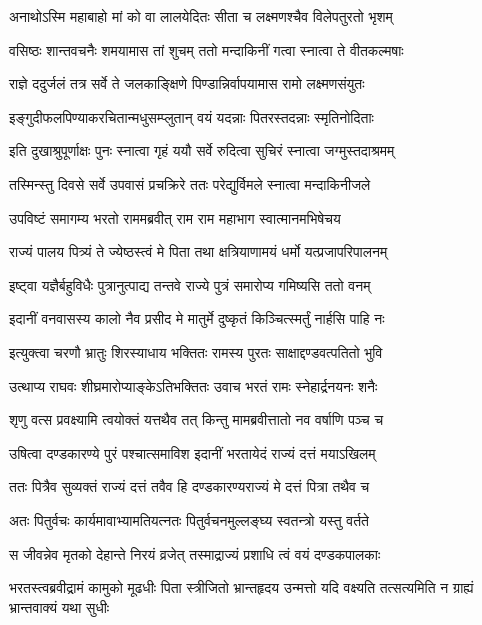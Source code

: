 \twolineshloka
{अनाथोऽस्मि महाबाहो मां को वा लालयेदितः}
{सीता च लक्ष्मणश्चैव विलेपतुरतो भृशम्} %

\twolineshloka
{वसिष्ठः शान्तवचनैः शमयामास तां शुचम्}
{ततो मन्दाकिनीं गत्वा स्नात्वा ते वीतकल्मषाः} %

\twolineshloka
{राज्ञे ददुर्जलं तत्र सर्वे ते जलकाङ्क्षिणे}
{पिण्डान्निर्वापयामास रामो लक्ष्मणसंयुतः} %

\twolineshloka
{इङ्गुदीफलपिण्याकरचितान्मधुसम्प्लुतान्}
{वयं यदन्नाः पितरस्तदन्नाः स्मृतिनोदिताः} %

\twolineshloka
{इति दुखाश्रुपूर्णाक्षः पुनः स्नात्वा गृहं ययौ}
{सर्वे रुदित्वा सुचिरं स्नात्वा जग्मुस्तदाश्रमम्} %

\twolineshloka
{तस्मिन्स्तु दिवसे सर्वे उपवासं प्रचक्रिरे}
{ततः परेद्युर्विमले स्नात्वा मन्दाकिनीजले} %

\twolineshloka
{उपविष्टं समागम्य भरतो राममब्रवीत्}
{राम राम महाभाग स्वात्मानमभिषेचय} %

\twolineshloka
{राज्यं पालय पित्र्यं ते ज्येष्ठस्त्वं मे पिता तथा}
{क्षत्रियाणामयं धर्मो यत्प्रजापरिपालनम्} %

\twolineshloka
{इष्ट्वा यज्ञैर्बहुविधैः पुत्रानुत्पाद्य तन्तवे}
{राज्ये पुत्रं समारोप्य गमिष्यसि ततो वनम्} %

\twolineshloka
{इदानीं वनवासस्य कालो नैव प्रसीद मे}
{मातुर्मे दुष्कृतं किञ्चित्स्मर्तुं नार्हसि पाहि नः} %

\twolineshloka
{इत्युक्त्वा चरणौ भ्रातुः शिरस्याधाय भक्तितः}
{रामस्य पुरतः साक्षाद्दण्डवत्पतितो भुवि} %

\twolineshloka
{उत्थाप्य राघवः शीघ्रमारोप्याङ्केऽतिभक्तितः}
{उवाच भरतं रामः स्नेहार्द्रनयनः शनैः} %

\twolineshloka
{शृणु वत्स प्रवक्ष्यामि त्वयोक्तं यत्तथैव तत्}
{किन्तु मामब्रवीत्तातो नव वर्षाणि पञ्च च} %

\twolineshloka
{उषित्वा दण्डकारण्ये पुरं पश्चात्समाविश}
{इदानीं भरतायेदं राज्यं दत्तं मयाऽखिलम्} %

\twolineshloka
{ततः पित्रैव सुव्यक्तं राज्यं दत्तं तवैव हि}
{दण्डकारण्यराज्यं मे दत्तं पित्रा तथैव च} %

\twolineshloka
{अतः पितुर्वचः कार्यमावाभ्यामतियत्नतः}
{पितुर्वचनमुल्लङ्घ्य स्वतन्त्रो यस्तु वर्तते} %

\twolineshloka
{स जीवन्नेव मृतको देहान्ते निरयं व्रजेत्}
{तस्माद्राज्यं प्रशाधि त्वं वयं दण्डकपालकाः} %

\threelineshloka
{भरतस्त्वब्रवीद्रामं कामुको मूढधीः पिता}
{स्त्रीजितो भ्रान्तहृदय उन्मत्तो यदि वक्ष्यति}
{तत्सत्यमिति न ग्राह्यं भ्रान्तवाक्यं यथा सुधीः} %

